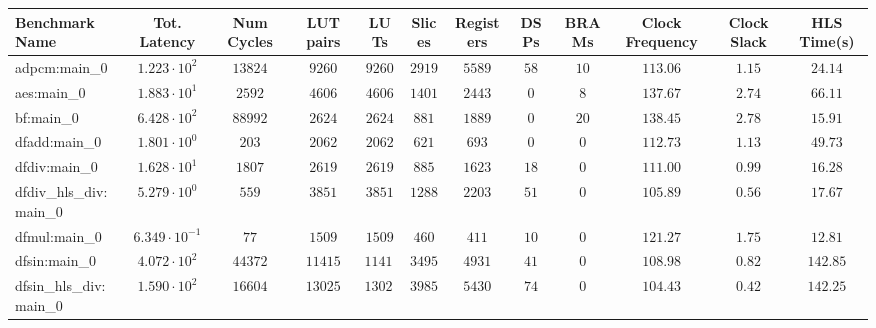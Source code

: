 \begin{tabular}{|l|c|c|c|c|c|c|c|c|c|c|c|}
\hline
Benchmark Name          & Tot. Latency            & Num Cycles & LUT pairs & LUTs      & Slices    & Registers & DSPs    & BRAMs   & Clock Frequency & Clock Slack & HLS Time(s) \\
\hline
adpcm:main\_0           & $ 1.223 \cdot 10^{2}  $ & $ 13824  $ & $ 9260  $ & $ 9260  $ & $ 2919  $ & $ 5589  $ & $ 58  $ & $ 10  $ & $ 113.06      $ & $ 1.15    $ & $ 24.14   $ \\
aes:main\_0             & $ 1.883 \cdot 10^{1}  $ & $ 2592   $ & $ 4606  $ & $ 4606  $ & $ 1401  $ & $ 2443  $ & $ 0   $ & $ 8   $ & $ 137.67      $ & $ 2.74    $ & $ 66.11   $ \\
bf:main\_0              & $ 6.428 \cdot 10^{2}  $ & $ 88992  $ & $ 2624  $ & $ 2624  $ & $ 881   $ & $ 1889  $ & $ 0   $ & $ 20  $ & $ 138.45      $ & $ 2.78    $ & $ 15.91   $ \\
dfadd:main\_0           & $ 1.801 \cdot 10^{0}  $ & $ 203    $ & $ 2062  $ & $ 2062  $ & $ 621   $ & $ 693   $ & $ 0   $ & $ 0   $ & $ 112.73      $ & $ 1.13    $ & $ 49.73   $ \\
dfdiv:main\_0           & $ 1.628 \cdot 10^{1}  $ & $ 1807   $ & $ 2619  $ & $ 2619  $ & $ 885   $ & $ 1623  $ & $ 18  $ & $ 0   $ & $ 111.00      $ & $ 0.99    $ & $ 16.28   $ \\
dfdiv\_hls\_div:main\_0 & $ 5.279 \cdot 10^{0}  $ & $ 559    $ & $ 3851  $ & $ 3851  $ & $ 1288  $ & $ 2203  $ & $ 51  $ & $ 0   $ & $ 105.89      $ & $ 0.56    $ & $ 17.67   $ \\
dfmul:main\_0           & $ 6.349 \cdot 10^{-1} $ & $ 77     $ & $ 1509  $ & $ 1509  $ & $ 460   $ & $ 411   $ & $ 10  $ & $ 0   $ & $ 121.27      $ & $ 1.75    $ & $ 12.81   $ \\
dfsin:main\_0           & $ 4.072 \cdot 10^{2}  $ & $ 44372  $ & $ 11415 $ & $ 11415 $ & $ 3495  $ & $ 4931  $ & $ 41  $ & $ 0   $ & $ 108.98      $ & $ 0.82    $ & $ 142.85  $ \\
dfsin\_hls\_div:main\_0 & $ 1.590 \cdot 10^{2}  $ & $ 16604  $ & $ 13025 $ & $ 13025 $ & $ 3985  $ & $ 5430  $ & $ 74  $ & $ 0   $ & $ 104.43      $ & $ 0.42    $ & $ 142.25  $ \\

\end{tabular}
